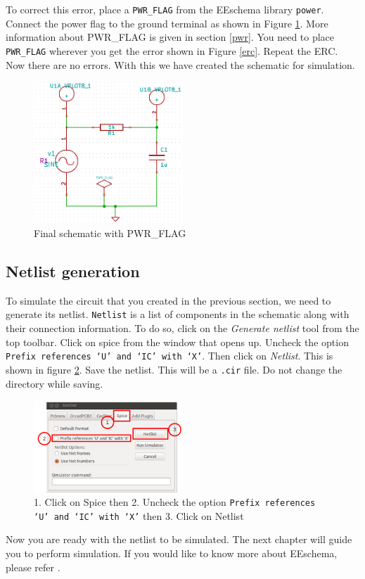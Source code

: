 To correct this error, place a {\tt PWR\_FLAG} from the EEschema library {\tt power}.  Connect the power flag to the ground terminal as shown in Figure \ref{schemfin}. More information about PWR\_FLAG is given in section \ref{pwr}. You need to place {\tt PWR\_FLAG} wherever you get the error shown in Figure \ref{erc}. Repeat the ERC. Now there are no errors. With this we have created the schematic for simulation.
\begin{figure}
\centering
\includegraphics[width=0.5\textwidth]{figures/schemfin}
\caption{Final schematic with PWR\_FLAG}
\label{schemfin}
\end{figure} 
\subsection{Netlist generation}
\label{chap5-netlist-generation}
To simulate the circuit that you created in the previous section, we need to generate its netlist. {\tt Netlist} is a list of components in the schematic along with their connection information.  To do so, click on the \textit{Generate netlist} tool from the top toolbar. Click on spice from the window that opens up. Uncheck the option {\tt Prefix references `U' and `IC' with `X'}. Then click on \textit{Netlist}. This is shown in figure \ref{chap5net}. Save the netlist. This will be a {\tt .cir} file. Do not change the directory while saving.
\begin{figure}
\centering
\includegraphics[width=0.5\textwidth]{figures/net}
\caption{1. Click on Spice then 2. Uncheck the option {\tt Prefix references `U' and `IC' with `X'} then 3. Click on Netlist }
\label{chap5net}
\end{figure} 

Now you are ready with the netlist to be simulated. The next chapter will guide you to perform simulation. If you would like to know more about EEschema, please refer \cite{kicad}.
%
